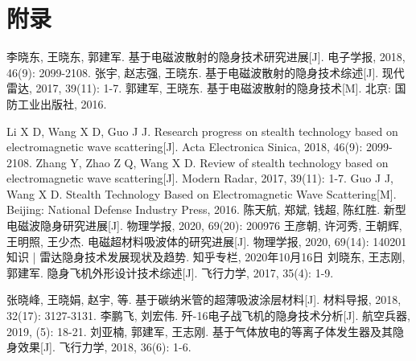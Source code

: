 \documentclass{article}
\begin{document}
\section{附录}
\begin{thebibliography}{99}  
    李晓东, 王晓东, 郭建军. 基于电磁波散射的隐身技术研究进展[J]. 电子学报, 2018, 46(9): 2099-2108.
    张宇, 赵志强, 王晓东. 基于电磁波散射的隐身技术综述[J]. 现代雷达, 2017, 39(11): 1-7.
    郭建军, 王晓东. 基于电磁波散射的隐身技术[M]. 北京: 国防工业出版社, 2016.

      Li X D, Wang X D, Guo J J. Research progress on stealth technology based on electromagnetic wave scattering[J]. Acta Electronica Sinica, 2018, 46(9): 2099-2108.
     Zhang Y, Zhao Z Q, Wang X D. Review of stealth technology based on electromagnetic wave scattering[J]. Modern Radar, 2017, 39(11): 1-7.
     Guo J J, Wang X D. Stealth Technology Based on Electromagnetic Wave Scattering[M]. Beijing: National Defense Industry Press, 2016.
     陈天航, 郑斌, 钱超, 陈红胜. 新型电磁波隐身研究进展[J]. 物理学报, 2020, 69(20): 200976
     王彦朝, 许河秀, 王朝辉, 王明照, 王少杰. 电磁超材料吸波体的研究进展[J]. 物理学报, 2020, 69(14): 140201
      知识 | 雷达隐身技术发展现状及趋势. 知乎专栏, 2020年10月16日
    刘晓东, 王志刚, 郭建军. 隐身飞机外形设计技术综述[J]. 飞行力学, 2017, 35(4): 1-9.

     张晓峰, 王晓娟, 赵宇, 等. 基于碳纳米管的超薄吸波涂层材料[J]. 材料导报, 2018, 32(17): 3127-3131.
     李鹏飞, 刘宏伟. 歼-16电子战飞机的隐身技术分析[J]. 航空兵器, 2019, (5): 18-21.
    刘亚楠, 郭建军, 王志刚. 基于气体放电的等离子体发生器及其隐身效果[J]. 飞行力学, 2018, 36(6): 1-6.
  \end{thebibliography}




\end{document}
